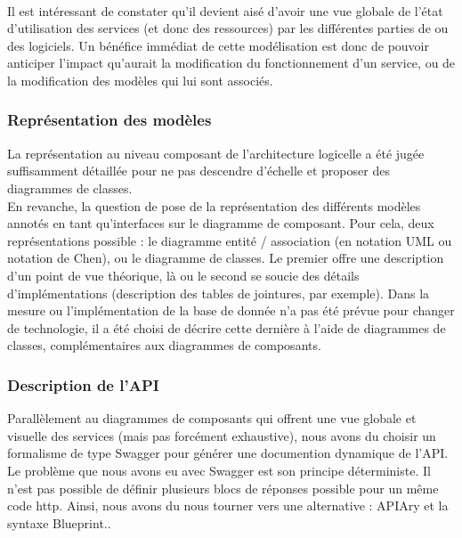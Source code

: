         \paragraph{}
            Il est intéressant de constater qu'il devient aisé d'avoir une vue globale de l'état
            d'utilisation des services (et donc des ressources) par les différentes parties de ou des
            logiciels. Un bénéfice immédiat de cette modélisation est donc de pouvoir anticiper l'impact
            qu'aurait la modification du fonctionnement d'un service, ou de la modification des modèles
            qui lui sont associés.

    \subsubsection{Représentation des modèles}
        La représentation au niveau composant de l'architecture logicelle a été jugée suffisamment
        détaillée pour ne pas descendre d'échelle et proposer des diagrammes de classes.\\
        En revanche, la question de pose de la représentation des différents modèles annotés en tant
        qu'interfaces sur le diagramme de composant. Pour cela, deux représentations possible :
        le diagramme entité / association (en notation UML ou notation de Chen), ou le diagramme de
        classes. Le premier offre une description d'un point de vue théorique, là ou le second se
        soucie des détails d'implémentations (description des tables de jointures, par exemple).
        Dans la mesure ou l'implémentation de la base de donnée n'a pas été prévue pour changer de
        technologie, il a été choisi de décrire cette dernière à l'aide de diagrammes de classes,
        complémentaires aux diagrammes de composants.

    \subsubsection{Description de l'API}
        Parallèlement au diagrammes de composants qui offrent une vue globale et visuelle des services
        (mais pas forcément exhaustive), nous avons du choisir un formalisme de type Swagger pour
        générer une documention dynamique de l'API.\\
        Le problème que nous avons eu avec Swagger est son principe déterministe\cite{determinism}.
        Il n'est pas possible de définir plusieurs blocs de réponses possible pour un même code http.
        Ainsi, nous avons du nous tourner vers une alternative : APIAry et la syntaxe Blueprint..


